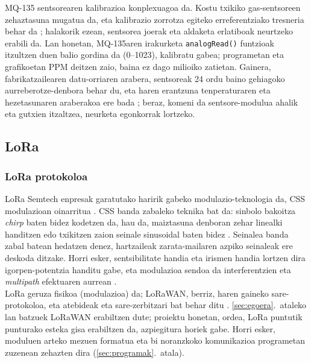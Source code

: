 \documentclass[10pt]{article}
\begin{document}
MQ-135 sentsorearen kalibrazioa konplexuagoa da. Kostu txikiko gas-sentsoreen zehaztasuna mugatua da, eta kalibrazio zorrotza egiteko erreferentziako tresneria behar da \cite{karagulian2019}; halakorik ezean, sentsorea joerak eta aldaketa erlatiboak neurtzeko erabili da. Lan honetan, MQ-135aren irakurketa \texttt{analogRead()} funtzioak itzultzen duen balio gordina da (0--1023), kalibratu gabea; programetan eta grafikoetan \ac{PPM} deitzen zaio, baina ez dago milioiko zatietan. Gainera, fabrikatzailearen datu-orriaren arabera, sentsoreak 24 ordu baino gehiagoko aurreberotze-denbora behar du, eta haren erantzuna tenperaturaren eta hezetasunaren araberakoa ere bada \cite{mq135_sensor}; beraz, komeni da sentsore-modulua ahalik eta gutxien itzaltzea, neurketa egonkorrak lortzeko.\\

\subsection{LoRa}
\label{sec:lora}

\subsubsection{LoRa protokoloa}
\label{protocollora}

\ac{LoRa} Semtech enpresak garatutako haririk gabeko modulazio-teknologia da, \ac{CSS} modulazioan oinarritua \cite{vangelista2017}. \ac{CSS} banda zabaleko teknika bat da: sinbolo bakoitza \textit{chirp} baten bidez kodetzen da, hau da, maiztasuna denboran zehar linealki handitzen edo txikitzen zaion seinale sinusoidal baten bidez \cite{springer2000spread}. Seinalea banda zabal batean hedatzen denez, hartzaileak zarata-mailaren azpiko seinaleak ere deskoda ditzake. Horri esker, sentsibilitate handia eta irismen handia lortzen dira igorpen-potentzia handitu gabe, eta modulazioa sendoa da interferentzien eta \textit{multipath} efektuaren aurrean \cite{bor2016lora,augustin2016}.\\

\ac{LoRa} geruza fisikoa (modulazioa) da; \ac{LoRaWAN}, berriz, haren gaineko sare-protokoloa, eta atebideak eta sare-zerbitzari bat behar ditu \cite{adelantado2017}. \ref{sec:egoera}.~ataleko lan batzuek \ac{LoRaWAN} erabiltzen dute; proiektu honetan, ordea, \ac{LoRa} puntutik punturako esteka gisa erabiltzen da, azpiegitura horiek gabe. Horri esker, moduluen arteko mezuen formatua eta bi noranzkoko komunikazioa programetan zuzenean zehazten dira (\ref{sec:programak}.~atala).\\
\end{document}
